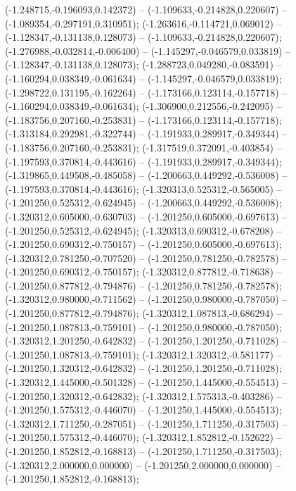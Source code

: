  (-1.248715,-0.196093,0.142372) -- (-1.109633,-0.214828,0.220607) -- (-1.089354,-0.297191,0.310951);
 (-1.263616,-0.114721,0.069012) -- (-1.128347,-0.131138,0.128073) -- (-1.109633,-0.214828,0.220607);
 (-1.276988,-0.032814,-0.006400) -- (-1.145297,-0.046579,0.033819) -- (-1.128347,-0.131138,0.128073);
 (-1.288723,0.049280,-0.083591) -- (-1.160294,0.038349,-0.061634) -- (-1.145297,-0.046579,0.033819);
 (-1.298722,0.131195,-0.162264) -- (-1.173166,0.123114,-0.157718) -- (-1.160294,0.038349,-0.061634);
 (-1.306900,0.212556,-0.242095) -- (-1.183756,0.207160,-0.253831) -- (-1.173166,0.123114,-0.157718);
 (-1.313184,0.292981,-0.322744) -- (-1.191933,0.289917,-0.349344) -- (-1.183756,0.207160,-0.253831);
 (-1.317519,0.372091,-0.403854) -- (-1.197593,0.370814,-0.443616) -- (-1.191933,0.289917,-0.349344);
 (-1.319865,0.449508,-0.485058) -- (-1.200663,0.449292,-0.536008) -- (-1.197593,0.370814,-0.443616);
 (-1.320313,0.525312,-0.565005) -- (-1.201250,0.525312,-0.624945) -- (-1.200663,0.449292,-0.536008);
 (-1.320312,0.605000,-0.630703) -- (-1.201250,0.605000,-0.697613) -- (-1.201250,0.525312,-0.624945);
 (-1.320313,0.690312,-0.678208) -- (-1.201250,0.690312,-0.750157) -- (-1.201250,0.605000,-0.697613);
 (-1.320312,0.781250,-0.707520) -- (-1.201250,0.781250,-0.782578) -- (-1.201250,0.690312,-0.750157);
 (-1.320312,0.877812,-0.718638) -- (-1.201250,0.877812,-0.794876) -- (-1.201250,0.781250,-0.782578);
 (-1.320312,0.980000,-0.711562) -- (-1.201250,0.980000,-0.787050) -- (-1.201250,0.877812,-0.794876);
 (-1.320312,1.087813,-0.686294) -- (-1.201250,1.087813,-0.759101) -- (-1.201250,0.980000,-0.787050);
 (-1.320312,1.201250,-0.642832) -- (-1.201250,1.201250,-0.711028) -- (-1.201250,1.087813,-0.759101);
 (-1.320312,1.320312,-0.581177) -- (-1.201250,1.320312,-0.642832) -- (-1.201250,1.201250,-0.711028);
 (-1.320312,1.445000,-0.501328) -- (-1.201250,1.445000,-0.554513) -- (-1.201250,1.320312,-0.642832);
 (-1.320312,1.575313,-0.403286) -- (-1.201250,1.575312,-0.446070) -- (-1.201250,1.445000,-0.554513);
 (-1.320312,1.711250,-0.287051) -- (-1.201250,1.711250,-0.317503) -- (-1.201250,1.575312,-0.446070);
 (-1.320312,1.852812,-0.152622) -- (-1.201250,1.852812,-0.168813) -- (-1.201250,1.711250,-0.317503);
 (-1.320312,2.000000,0.000000) -- (-1.201250,2.000000,0.000000) -- (-1.201250,1.852812,-0.168813);
